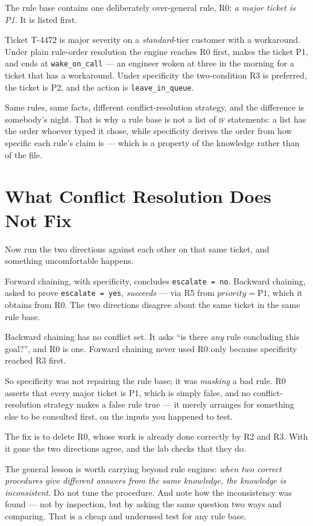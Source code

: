 \begin{alertbox}
The rule base contains one deliberately over-general rule, R0: \emph{a major
ticket is P1}. It is listed first.

Ticket T-4472 is major severity on a \emph{standard}-tier customer with a
workaround. Under plain rule-order resolution the engine reaches R0 first, makes
the ticket P1, and ends at \texttt{wake\_on\_call} --- an engineer woken at three in
the morning for a ticket that has a workaround. Under specificity the
two-condition R3 is preferred, the ticket is P2, and the action is
\texttt{leave\_in\_queue}.

Same rules, same facts, different conflict-resolution strategy, and the difference
is somebody's night. That is why a rule base is not a list of \textsc{if}
statements: a list has the order whoever typed it chose, while specificity derives
the order from how specific each rule's claim is --- which is a property of the
knowledge rather than of the file.
\end{alertbox}

\section{What Conflict Resolution Does Not Fix}

Now run the two directions against each other on that same ticket, and something
uncomfortable happens.

Forward chaining, with specificity, concludes \texttt{escalate = no}. Backward
chaining, asked to prove \texttt{escalate = yes}, \emph{succeeds} --- via R5 from
$\mathit{priority} = \text{P1}$, which it obtains from R0. The two directions
disagree about the same ticket in the same rule base.

\begin{conceptbox}
Backward chaining has no conflict set. It asks ``is there \emph{any} rule
concluding this goal?'', and R0 is one. Forward chaining never used R0 only because
specificity reached R3 first.

So specificity was not repairing the rule base; it was \emph{masking} a bad rule.
R0 asserts that every major ticket is P1, which is simply false, and no
conflict-resolution strategy makes a false rule true --- it merely arranges for
something else to be consulted first, on the inputs you happened to test.

The fix is to delete R0, whose work is already done correctly by R2 and R3. With it
gone the two directions agree, and the lab checks that they do.

\smallskip
The general lesson is worth carrying beyond rule engines: \emph{when two correct
procedures give different answers from the same knowledge, the knowledge is
inconsistent}. Do not tune the procedure. And note how the inconsistency was found
--- not by inspection, but by asking the same question two ways and comparing.
That is a cheap and underused test for any rule base.
\end{conceptbox}

